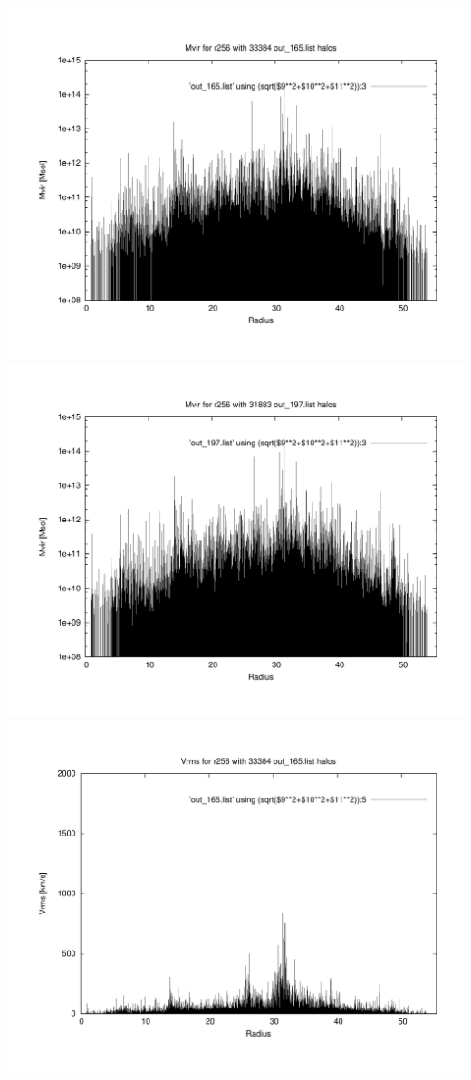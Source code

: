 \includegraphics[scale=0.3]{r256/h70/red_st14_log1/plot_mvir_out_165.pdf}
\includegraphics[scale=0.3]{r256/h70/red_st14_log1/plot_mvir_out_197.pdf}
\includegraphics[scale=0.3]{r256/h70/red_st14_log1/plot_Vrms_out_165.pdf}
